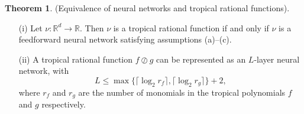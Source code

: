 \documentclass{article}
\theoremstyle{definition}
\newtheorem{theorem}{Theorem}[section]
\begin{document}
\begin{theorem}\cite{zhang2018tropical}
\label{theo:network_eq_rat_fnkt}
(Equivalence of neural networks and tropical
rational functions).
\begin{itemize}
\item[(i)]
Let $\nu : \mathbb{R}^{d} \to \mathbb{R}$. Then $\nu$ is a tropical rational function if and only if $\nu$ is a feedforward neural network satisfying assumptions (a)–(c).
\item[(ii)]
A tropical rational function $f \oslash g$ can be represented as an $L$-layer neural network, with
$$ L \leq \max \{ \lceil \log_2 r_f \rceil, \lceil \log_2 r_g \rceil \} + 2,$$
where $r_f$ and $r_g$ are the number of monomials in the tropical polynomials $f$ and $g$ respectively.
\end{itemize}
\end{theorem}
\end{document}
